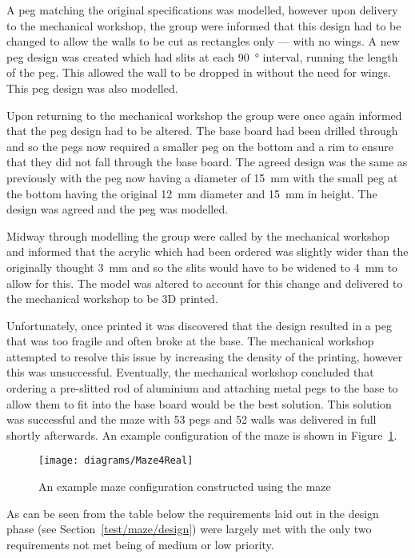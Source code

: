 A peg matching the original specifications was modelled, however upon delivery
to the mechanical workshop, the group were informed that this design had to be
changed to allow the walls to be cut as rectangles only --- with no wings. A new
peg design was created which had slits at each \SI{90}{\degree} interval,
running the length of the peg. This allowed the wall to be dropped in without
the need for wings. This peg design was also modelled.

Upon returning to the mechanical workshop the group were once again informed
that the peg design had to be altered. The base board had been drilled through
and so the pegs now required a smaller peg on the bottom and a rim to ensure
that they did not fall through the base board. The agreed design was the same as
previously with the peg now having a diameter of \SI{15}{\mm} with the small peg
at the bottom having the original \SI{12}{\mm} diameter and \SI{15}{\mm} in
height. The design was agreed and the peg was modelled.

Midway through modelling the group were called by the mechanical workshop and
informed that the acrylic which had been ordered was slightly wider than the
originally thought \SI{3}{\mm} and so the slits would have to be widened to
\SI{4}{\mm} to allow for this. The model was altered to account for this change and delivered to the mechanical workshop to be 3D printed.

Unfortunately, once printed it was discovered that the design resulted in a peg
that was too fragile and often broke at the base. The mechanical workshop
attempted to resolve this issue by increasing the density of the printing,
however this was unsuccessful. Eventually, the mechanical workshop concluded
that ordering a pre-slitted rod of aluminium and attaching metal pegs to the
base to allow them to fit into the base board would be the best solution. This
solution was successful and the maze with 53 pegs and 52 walls was
delivered in full shortly afterwards. An example configuration of the maze is shown in Figure~\ref{fig:maze_pic}.

\begin{figure}[!ht]
	\centering
	\texttt{[image: diagrams/Maze4Real]}
	\caption{An example maze configuration constructed using the maze}\label{fig:maze_pic}

\end{figure}


As can be seen from the table below the requirements laid out in the design
phase (see Section~\ref{test/maze/design}) were largely met with the only two
requirements not met being of medium or low priority.

